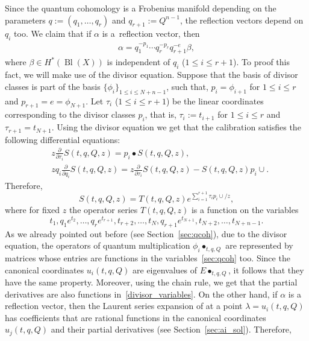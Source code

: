 \documentclass[pdftex]{sigma}
\numberwithin{equation}{section}
\begin{document}
Since the quantum cohomology is a Frobenius manifold depending on the parameters $q:=(q_1,\dots,q_r)$ and $q_{r+1}:=Q^{n-1}$, the reflection vectors depend on $q_i$ too. We claim that if $\alpha$ is a~reflection vector, then
\begin{gather}\label{refl:q_dep}
\alpha=q_1^{-p_1}\cdots q_r^{-p_r} q_{r+1}^{- e}\beta,
\end{gather}
where $\beta\in H^*(\operatorname{Bl}(X))$ is independent of
$q_i$ ($1\leq i\leq r+1$). To proof this fact, we will make use of the divisor equation. Suppose that the basis of divisor classes is part of the basis $\{\phi_i\}_{1\leq i\leq N+n-1}$, such that, $p_i=\phi_{i+1}$ for $1\leq i\leq r$ and $p_{r+1}= e = \phi_{N+1}$. Let $\tau_i$ ($1\leq i\leq r+1$) be the linear coordinates corresponding to the divisor classes $p_i$, that is, $\tau_i:=t_{i+1}$ for $1\leq i\leq r$ and $\tau_{r+1}=t_{N+1}$. Using the divisor equation we get that the calibration satisfies the following differential equations:
\begin{align*}
&z\frac{\partial}{\partial \tau_i}S(t,q,Q,z)=
p_i\bullet S(t,q,Q,z),\\
&zq_i\frac{\partial}{\partial q_i}S(t,q,Q,z)=
z\frac{\partial}{\partial \tau_i}S(t,q,Q,z)-S(t,q,Q,z)p_i\cup.
\end{align*}
Therefore,
\[
S(t,q,Q,z)=T(t,q,Q,z)e^{\sum^{r+1}_{i=1}\tau_i p_i\cup /z},
\]
 where
for fixed $z$ the operator series $T(t,q,Q,z)$ is a function on the variables
\begin{equation}\label{divisor_variables}
t_1, q_1e^{t_2},\dots, q_r e^{t_{r+1}}, t_{r+2}, \dots, t_N,
q_{r+1} e^{t_{N+1}}, t_{N+2},\dots, t_{N+n-1}.
\end{equation}
As we already pointed out before (see Section~\ref{sec:qcoh}), due to the divisor equation, the operators of quantum multiplication $\phi_i\bullet_{t,q,Q}$ are represented by matrices whose entries are functions in the variables~\eqref{sec:qcoh} too. Since the canonical coordinates $u_i(t,q,Q)$ are eigenvalues of $E\bullet_{t,q,Q}$, it follows that they have the same property. Moreover, using the chain rule, we get that the partial derivatives  are also functions in~\eqref{divisor_variables}. On the other hand, if $\alpha$ is a reflection vector, then the Laurent series expansion of  at a point $\lambda=u_i(t,q,Q)$ has coefficients that are rational functions in the canonical coordinates $u_j(t,q,Q)$ and their partial derivatives
 (see Section~\ref{sec:ai_sol}). Therefore,
\end{document}
